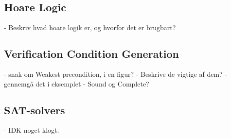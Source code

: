 \subsection{Hoare Logic}
- Beskriv hvad hoare logik er, og hvorfor det er brugbart?


\subsection{Verification Condition Generation}
- snak om Weakest precondition, i en figur?
- Beskrive de vigtige af dem?
- gennemgå det i eksemplet
- Sound og Complete?

\subsection{SAT-solvers}
- IDK noget klogt.
